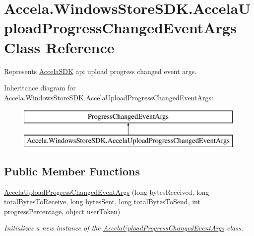 \hypertarget{class_accela_1_1_windows_store_s_d_k_1_1_accela_upload_progress_changed_event_args}{\section{Accela.\+Windows\+Store\+S\+D\+K.\+Accela\+Upload\+Progress\+Changed\+Event\+Args Class Reference}
\label{class_accela_1_1_windows_store_s_d_k_1_1_accela_upload_progress_changed_event_args}
}


Represents \hyperlink{class_accela_1_1_windows_store_s_d_k_1_1_accela_s_d_k}{Accela\+S\+D\+K} api upload progress changed event args.  


Inheritance diagram for Accela.\+Windows\+Store\+S\+D\+K.\+Accela\+Upload\+Progress\+Changed\+Event\+Args\+:\begin{figure}[H]
\begin{center}
\leavevmode
\includegraphics[height=2.000000cm]{class_accela_1_1_windows_store_s_d_k_1_1_accela_upload_progress_changed_event_args}
\end{center}
\end{figure}
\subsection*{Public Member Functions}
\begin{DoxyCompactItemize}
\item 
\hyperlink{class_accela_1_1_windows_store_s_d_k_1_1_accela_upload_progress_changed_event_args_a9a5fa30efd2b2af5d01af25e3b84e750}{Accela\+Upload\+Progress\+Changed\+Event\+Args} (long bytes\+Received, long total\+Bytes\+To\+Receive, long bytes\+Sent, long total\+Bytes\+To\+Send, int progress\+Percentage, object user\+Token)
\begin{DoxyCompactList}\small\item\em Initializes a new instance of the \hyperlink{class_accela_1_1_windows_store_s_d_k_1_1_accela_upload_progress_changed_event_args}{Accela\+Upload\+Progress\+Changed\+Event\+Args} class. \end{DoxyCompactList}\end{DoxyCompactItemize}
